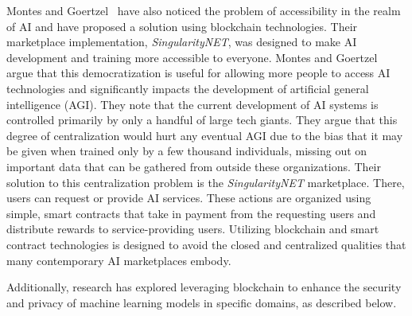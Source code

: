 \documentclass{ledger}
\begin{document}
Montes and Goertzel~\cite{democratizedAI} have also noticed the problem of accessibility in the realm of AI and have proposed a solution using blockchain technologies. Their marketplace implementation, \textit{SingularityNET}, was designed to make AI development and training more accessible to everyone. Montes and Goertzel argue that this democratization is useful for allowing more people to access AI technologies and significantly impacts the development of artificial general intelligence (AGI).
%
They note that the current development of AI systems is controlled primarily by only a handful of large tech giants. They argue that this degree of centralization would hurt any eventual AGI due to the bias that it may be given when trained only by a few thousand individuals, missing out on important data that can be gathered from outside these organizations.
%
Their solution to this centralization problem is the \textit{SingularityNET} marketplace. There, users can request or provide AI services. These actions are organized using simple, smart contracts that take in payment from the requesting users and distribute rewards to service-providing users. Utilizing blockchain and smart contract technologies is designed to avoid the closed and centralized qualities that many contemporary AI marketplaces embody.


Additionally, research has explored leveraging blockchain to enhance the security and privacy of machine learning models in specific domains, as described below.
\end{document}
